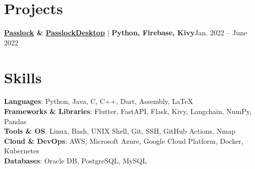 \section{Projects}
\resumeSubHeadingListStart

\resumeProjectHeading
{\textbf{\href{https://github.com/AM-ash-OR-AM-I/Passlock}{\underline{Passlock}} \& \href{https://github.com/AM-ash-OR-AM-I/PasslockDesktop}{\underline{PasslockDesktop}}} $|$ \textbf{Python, Firebase, Kivy}}{Jan. 2022 -- June 2022}
\resumeItemListStart
{}
\resumeItemListEnd

\resumeSubHeadingListEnd

\vspace{-10px}
\section{Skills}
\begin{itemize}[leftmargin=0.15in, label={}]
  \small{\item{
        \textbf{Languages}{: Python, Java, C, C++, Dart, Assembly, LaTeX} \\
        \textbf{Frameworks \& Libraries}{: Flutter, FastAPI, Flask, Kivy, Langchain, NumPy, Pandas} \\
        \textbf{Tools \& OS}{: Linux, Bash, UNIX Shell, Git, SSH, GitHub Actions, Nmap} \\
        \textbf{Cloud \& DevOps}{: AWS, Microsoft Azure, Google Cloud Platform, Docker, Kubernetes} \\
        \textbf{Databases}{: Oracle DB, PostgreSQL, MySQL} \\
        }}

\end{itemize}

